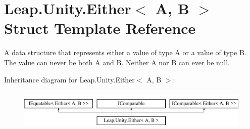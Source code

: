 \hypertarget{struct_leap_1_1_unity_1_1_either}{}\section{Leap.\+Unity.\+Either$<$ A, B $>$ Struct Template Reference}
\label{struct_leap_1_1_unity_1_1_either}


A data structure that represents either a value of type A or a value of type B. The value can never be both A and B. Neither A nor B can ever be null.  


Inheritance diagram for Leap.\+Unity.\+Either$<$ A, B $>$\+:\begin{figure}[H]
\begin{center}
\leavevmode
\includegraphics[height=1.934370cm]{struct_leap_1_1_unity_1_1_either}
\end{center}
\end{figure}
